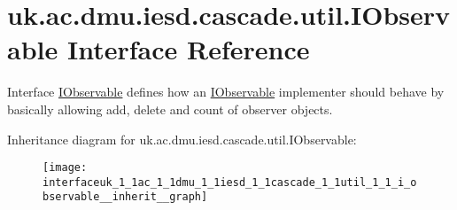 \hypertarget{interfaceuk_1_1ac_1_1dmu_1_1iesd_1_1cascade_1_1util_1_1_i_observable}{\section{uk.\-ac.\-dmu.\-iesd.\-cascade.\-util.\-I\-Observable Interface Reference}
\label{interfaceuk_1_1ac_1_1dmu_1_1iesd_1_1cascade_1_1util_1_1_i_observable}
}


Interface {\ttfamily \hyperlink{interfaceuk_1_1ac_1_1dmu_1_1iesd_1_1cascade_1_1util_1_1_i_observable}{I\-Observable}} defines how an \hyperlink{interfaceuk_1_1ac_1_1dmu_1_1iesd_1_1cascade_1_1util_1_1_i_observable}{I\-Observable} implementer should behave by basically allowing add, delete and count of observer objects.  




Inheritance diagram for uk.\-ac.\-dmu.\-iesd.\-cascade.\-util.\-I\-Observable\-:\nopagebreak
\begin{figure}[H]
\begin{center}
\leavevmode
\texttt{[image: interfaceuk\_1\_1ac\_1\_1dmu\_1\_1iesd\_1\_1cascade\_1\_1util\_1\_1\_i\_observable\_\_inherit\_\_graph]}
\end{center}
\end{figure}
